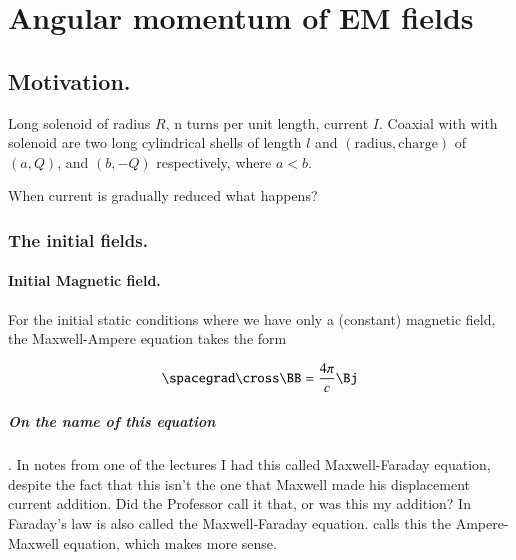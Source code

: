%
%

\chapter{Angular momentum of EM fields}
\label{chap:relativisticElectrodynamicsT5}
{}
\date{Mar 10, 2011}

\beginArtWithToc

\section{Motivation.}

Long solenoid of radius $R$, n turns per unit length, current $I$.  Coaxial with with solenoid are two long cylindrical shells of length $l$ and $(\text{radius},\text{charge})$ of $(a, Q)$, and $(b, -Q)$ respectively, where $a < b$.

When current is gradually reduced what happens?

\subsection{The initial fields.}
\subsubsection{Initial Magnetic field.}

For the initial static conditions where we have only a (constant) magnetic field, the Maxwell-Ampere equation takes the form

\begin{equation}\label{eqn:relativisticElectrodynamicsT5:10}
\spacegrad \cross \BB = \frac{4 \pi}{c} \Bj
\end{equation}

\paragraph{On the name of this equation}.  In notes from one of the lectures I had this called Maxwell-Faraday equation, despite the fact that this isn't the one that Maxwell made his displacement current addition.  Did the Professor call it that, or was this my addition?  In \cite{wiki:Faraday} Faraday's law is also called the Maxwell-Faraday equation.  \cite{fleisch2007ssg} calls this the Ampere-Maxwell equation, which makes more sense.


